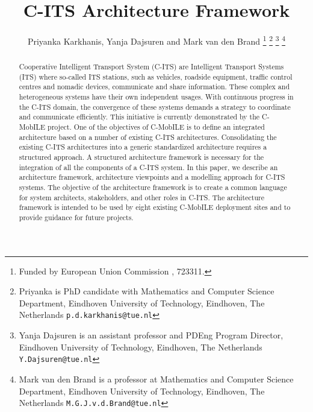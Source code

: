 \documentclass[letterpaper, 10 pt, conference]{ieeeconf}  %
\title{\LARGE \bf
C-ITS Architecture Framework
}
\author{Priyanka Karkhanis, Yanja Dajsuren and Mark van den Brand%
\thanks{Funded by European Union Commission , 723311.}%
\thanks{Priyanka is PhD candidate with Mathematics and Computer Science Department,
     Eindhoven University of Technology, Eindhoven, The Netherlands
        {\tt\small p.d.karkhanis@tue.nl}}%
\thanks{Yanja Dajsuren is an assistant professor and PDEng Program Director,
	 Eindhoven University of Technology, Eindhoven, The Netherlands
        {\tt\small Y.Dajsuren@tue.nl}}%
\thanks{Mark van den Brand is a professor at Mathematics and Computer Science Department,
  	 Eindhoven University of Technology, Eindhoven, The Netherlands
  	{\tt\small M.G.J.v.d.Brand@tue.nl}}%
}
\begin{document}
\maketitle
\thispagestyle{empty}
\pagestyle{empty}


\begin{abstract}

Cooperative Intelligent Transport System (C-ITS) are Intelligent Transport Systems (ITS) where so-called ITS stations, such as vehicles, roadside equipment, traffic control centres and nomadic devices, communicate and share information. These complex and heterogeneous systems have their own independent usages. With continuous progress in the C-ITS domain, the convergence of these systems demands a strategy to coordinate and communicate efficiently. This initiative is currently demonstrated by the C-MobILE project. One of the objectives of C-MobILE is to define an integrated architecture based on a number of existing C-ITS architectures. Consolidating the existing C-ITS architectures into a generic standardized architecture requires a structured approach. A structured architecture framework is necessary for the integration of all the components of a C-ITS system.
In this paper, we describe an architecture framework, architecture viewpoints and a modelling approach for C-ITS systems. The objective of the architecture framework is to create a common language for system architects, stakeholders, and other roles in C-ITS. The architecture framework is intended to be used by eight existing C-MobILE deployment sites and to provide guidance for future projects.

\end{abstract}


\end{document}
